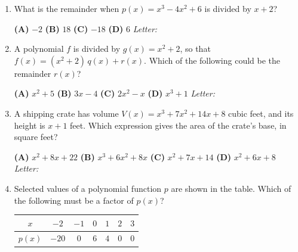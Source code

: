\documentclass[10pt]{article}
\begin{document}
\begin{enumerate}[leftmargin=1.9em, itemsep=14pt]

\item What is the remainder when $p(x) = x^3 - 4x^2 + 6$ is divided by $x + 2$?

      \smallskip
      \textbf{(A)} $-2$ \hspace{2.6em} \textbf{(B)} $18$ \hspace{2.6em} \textbf{(C)} $-18$ \hspace{2.6em} \textbf{(D)} $6$ \hfill\textit{Letter:}~\gradedblank[id=ap1, type=choice, points=1, answer=C]{0.42in}{13pt}

\item A polynomial $f$ is divided by $g(x) = x^2 + 2$, so that $f(x) = (x^2 + 2)\,q(x) + r(x)$.
      Which of the following could be the remainder $r(x)$?

      \smallskip
      \textbf{(A)} $x^2 + 5$ \hspace{2.6em} \textbf{(B)} $3x - 4$ \hspace{2.6em} \textbf{(C)} $2x^2 - x$ \hspace{2.6em} \textbf{(D)} $x^3 + 1$ \hfill\textit{Letter:}~\gradedblank[id=ap2, type=choice, points=1, answer=B]{0.42in}{13pt}

\item A shipping crate has volume $V(x) = x^3 + 7x^2 + 14x + 8$ cubic feet, and its height is
      $x + 1$ feet. Which expression gives the area of the crate's base, in square feet?

      \smallskip
      \textbf{(A)} $x^2 + 8x + 22$ \hspace{1.6em} \textbf{(B)} $x^3 + 6x^2 + 8x$ \hspace{1.6em} \textbf{(C)} $x^2 + 7x + 14$ \hspace{1.6em} \textbf{(D)} $x^2 + 6x + 8$ \hfill\textit{Letter:}~\gradedblank[id=ap3, type=choice, points=1, answer=D]{0.42in}{13pt}

\item Selected values of a polynomial function $p$ are shown in the table. Which of the
      following must be a factor of $p(x)$?

      \smallskip
      {\renewcommand{\arraystretch}{1.25}%
      \begin{tabular}{|c|c|c|c|c|c|c|}
      \hline $x$ & $-2$ & $-1$ & $0$ & $1$ & $2$ & $3$ \\ \hline
      $p(x)$ & $-20$ & $0$ & $6$ & $4$ & $0$ & $0$ \\ \hline
      \end{tabular}}


\end{enumerate}
\end{document}
